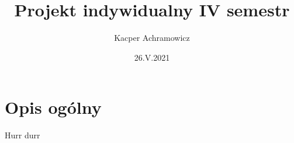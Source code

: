 \documentclass[11pt]{article}
\begin{document}
\title{Projekt indywidualny IV semestr}
\author{Kacper Achramowicz}
\date{26.V.2021}
\maketitle 
\tableofcontents

\section{Opis ogólny}
Hurr durr
\end{document}
